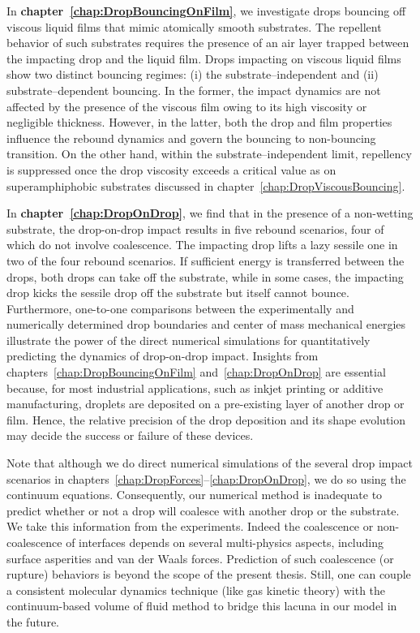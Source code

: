In \textbf{chapter~\ref{chap:DropBouncingOnFilm}}, we investigate drops bouncing off viscous liquid films that mimic atomically smooth substrates. The repellent behavior of such substrates requires the presence of an air layer trapped between the impacting drop and the liquid film. Drops impacting on viscous liquid films show two distinct bouncing regimes: (i) the substrate--independent and (ii) substrate--dependent bouncing. In the former, the impact dynamics are not affected by the presence of the viscous film owing to its high viscosity or negligible thickness. However, in the latter, both the drop and film properties influence the rebound dynamics and govern the bouncing to non-bouncing transition. On the other hand, within the substrate--independent limit, repellency is suppressed once the drop viscosity exceeds a critical value as on superamphiphobic substrates discussed in chapter~\ref{chap:DropViscousBouncing}.

In \textbf{chapter~\ref{chap:DropOnDrop}}, we find that in the presence of a non-wetting substrate, the drop-on-drop impact results in five rebound scenarios, four of which do not involve coalescence. The impacting drop lifts a lazy sessile one in two of the four rebound scenarios. If sufficient energy is transferred between the drops, both drops can take off the substrate, while in some cases, the impacting drop kicks the sessile drop off the substrate but itself cannot bounce. Furthermore, one-to-one comparisons between the experimentally and numerically determined drop boundaries and center of mass mechanical energies illustrate the power of the direct numerical simulations for quantitatively predicting the dynamics of drop-on-drop impact. Insights from chapters~\ref{chap:DropBouncingOnFilm} and~\ref{chap:DropOnDrop} are essential because, for most industrial applications, such as inkjet printing or additive manufacturing, droplets are deposited on a pre-existing layer of another drop or film. Hence, the relative precision of the drop deposition and its shape evolution may decide the success or failure of these devices. 

Note that although we do direct numerical simulations of the several drop impact scenarios in chapters~\ref{chap:DropForces}--\ref{chap:DropOnDrop}, we do so using the continuum equations. Consequently, our numerical method is inadequate to predict whether or not a drop will coalesce with another drop or the substrate. We take this information from the experiments. Indeed the coalescence or non-coalescence of interfaces depends on several multi-physics aspects, including surface asperities and van der Waals forces. Prediction of such coalescence (or rupture) behaviors is beyond the scope of the present thesis. Still, one can couple a consistent molecular dynamics technique (like gas kinetic theory) with the continuum-based volume of fluid method to bridge this lacuna in our model in the future.

